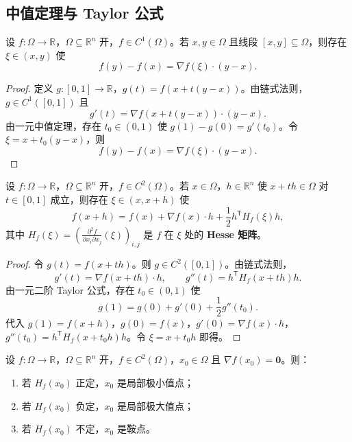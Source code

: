 \subsection{中值定理与 Taylor 公式}

\begin{theorem}[多变量中值定理]\label{thm:multivariable_mean_value}
设 $f: \Omega \to \mathbb{R}$，$\Omega \subseteq \mathbb{R}^n$ 开，$f \in C^1(\Omega)$。若 $x, y \in \Omega$ 且线段 $[x, y] \subseteq \Omega$，则存在 $\xi \in (x, y)$ 使
\[
f(y) - f(x) = \nabla f(\xi) \cdot (y - x).
\]
\end{theorem}

\begin{proof}
定义 $g: [0, 1] \to \mathbb{R}$，$g(t) = f(x + t(y - x))$。由链式法则，$g \in C^1([0, 1])$ 且
\[
g'(t) = \nabla f(x + t(y - x)) \cdot (y - x).
\]
由一元中值定理，存在 $t_0 \in (0, 1)$ 使 $g(1) - g(0) = g'(t_0)$。令 $\xi = x + t_0(y - x)$，则
\[
f(y) - f(x) = \nabla f(\xi) \cdot (y - x).
\]
\end{proof}

\begin{theorem}[二阶 Taylor 公式]\label{thm:taylor_second_order}
设 $f: \Omega \to \mathbb{R}$，$\Omega \subseteq \mathbb{R}^n$ 开，$f \in C^2(\Omega)$。若 $x \in \Omega$，$h \in \mathbb{R}^n$ 使 $x + t h \in \Omega$ 对 $t \in [0, 1]$ 成立，则存在 $\xi \in (x, x + h)$ 使
\[
f(x + h) = f(x) + \nabla f(x) \cdot h + \frac{1}{2} h^{\mathsf T} H_f(\xi) h,
\]
其中 $H_f(\xi) = \left( \frac{\partial^2 f}{\partial x_i \partial x_j}(\xi) \right)_{i,j}$ 是 $f$ 在 $\xi$ 处的 \textbf{Hesse 矩阵}。
\end{theorem}

\begin{proof}
令 $g(t) = f(x + t h)$。则 $g \in C^2([0, 1])$。由链式法则，
\[
g'(t) = \nabla f(x + t h) \cdot h, \qquad g''(t) = h^{\mathsf T} H_f(x + t h) h.
\]
由一元二阶 Taylor 公式，存在 $t_0 \in (0, 1)$ 使
\[
g(1) = g(0) + g'(0) + \frac{1}{2} g''(t_0).
\]
代入 $g(1) = f(x + h)$，$g(0) = f(x)$，$g'(0) = \nabla f(x) \cdot h$，$g''(t_0) = h^{\mathsf T} H_f(x + t_0 h) h$。令 $\xi = x + t_0 h$ 即得。
\end{proof}

\begin{corollary}[极值的二阶条件]\label{cor:extremum_second_order}
设 $f: \Omega \to \mathbb{R}$，$\Omega \subseteq \mathbb{R}^n$ 开，$f \in C^2(\Omega)$，$x_0 \in \Omega$ 且 $\nabla f(x_0) = \mathbf{0}$。则：
\begin{enumerate}[label=(\roman*)]
    \item 若 $H_f(x_0)$ 正定，$x_0$ 是局部极小值点；
    \item 若 $H_f(x_0)$ 负定，$x_0$ 是局部极大值点；
    \item 若 $H_f(x_0)$ 不定，$x_0$ 是鞍点。
\end{enumerate}
\end{corollary}

